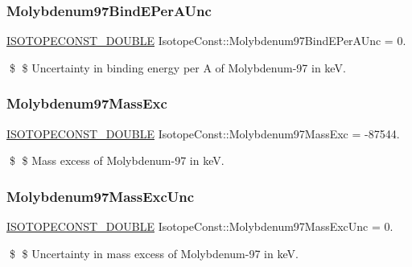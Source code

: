 \subsubsection{\texorpdfstring{Molybdenum97\+Bind\+E\+Per\+A\+Unc}{Molybdenum97BindEPerAUnc}}
{\footnotesize\ttfamily \mbox{\hyperlink{group___isotope_const-_macros_ga8f45a7272ce02c0b4c65c44636ed719a}{I\+S\+O\+T\+O\+P\+E\+C\+O\+N\+S\+T\+\_\+\+D\+O\+U\+B\+LE}} Isotope\+Const\+::\+Molybdenum97\+Bind\+E\+Per\+A\+Unc = 0.}

\$ \$ Uncertainty in binding energy per A of Molybdenum-\/97 in keV. \mbox{\label{group___isotope_const-_molybdenum-_mo97_gad69f288614c8f9030727e1fc13e4879f}} 
\subsubsection{\texorpdfstring{Molybdenum97\+Mass\+Exc}{Molybdenum97MassExc}}
{\footnotesize\ttfamily \mbox{\hyperlink{group___isotope_const-_macros_ga8f45a7272ce02c0b4c65c44636ed719a}{I\+S\+O\+T\+O\+P\+E\+C\+O\+N\+S\+T\+\_\+\+D\+O\+U\+B\+LE}} Isotope\+Const\+::\+Molybdenum97\+Mass\+Exc = -\/87544.}

\$ \$ Mass excess of Molybdenum-\/97 in keV. \mbox{\label{group___isotope_const-_molybdenum-_mo97_gaa0740a296c145ccd40304d7759af54e5}} 
\subsubsection{\texorpdfstring{Molybdenum97\+Mass\+Exc\+Unc}{Molybdenum97MassExcUnc}}
{\footnotesize\ttfamily \mbox{\hyperlink{group___isotope_const-_macros_ga8f45a7272ce02c0b4c65c44636ed719a}{I\+S\+O\+T\+O\+P\+E\+C\+O\+N\+S\+T\+\_\+\+D\+O\+U\+B\+LE}} Isotope\+Const\+::\+Molybdenum97\+Mass\+Exc\+Unc = 0.}

\$ \$ Uncertainty in mass excess of Molybdenum-\/97 in keV. \mbox{\label{group___isotope_const-_molybdenum-_mo97_ga7db32c38f4c1adc421229ca070bc8629}} 
